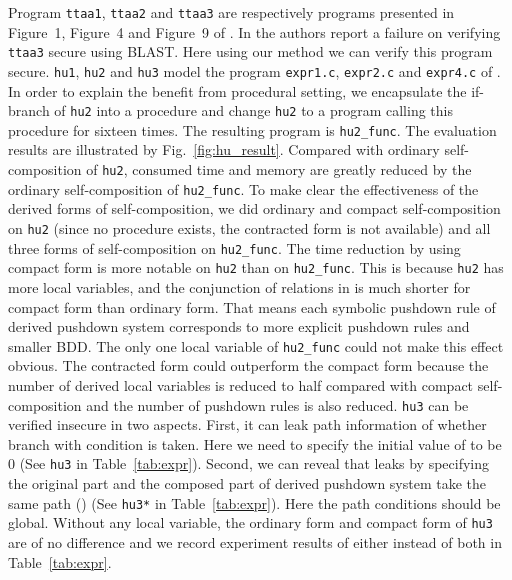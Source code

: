 \documentclass{llncs}
\begin{document}
Program \texttt{ttaa1}, \texttt{ttaa2} and \texttt{ttaa3} are
respectively programs presented in Figure~1, Figure~4 and Figure~9
of \cite{DBLP:conf/sas/TerauchiA05}. In
\cite{DBLP:conf/sas/TerauchiA05} the authors report a failure on
verifying \texttt{ttaa3} secure using BLAST. Here using our method
we can verify this program secure. \texttt{hu1}, \texttt{hu2} and
\texttt{hu3} model the program \texttt{expr1.c}, \texttt{expr2.c}
and \texttt{expr4.c} of \cite{DBLP:conf/pldi/UnnoKY06}. In order to
explain the benefit from procedural setting, we encapsulate the
\textrm{if}-branch of \texttt{hu2} into a procedure and change
\texttt{hu2} to a program calling this procedure for sixteen times.
The resulting program is \texttt{hu2\_func}. The evaluation results
are illustrated by Fig.~\ref{fig:hu_result}. Compared with ordinary
self-composition of \texttt{hu2}, consumed time and memory are
greatly reduced by the ordinary self-composition of
\texttt{hu2\_func}. To make clear the effectiveness of the derived
forms of self-composition, we did ordinary and compact
self-composition on \texttt{hu2} (since no procedure exists, the
contracted form is not available) and all three forms of
self-composition on \texttt{hu2\_func}. The time reduction by using
compact form is more notable on \texttt{hu2} than on
\texttt{hu2\_func}. This is because \texttt{hu2} has more local
variables, and the conjunction of relations in  is much shorter
for compact form than ordinary form. That means each symbolic
pushdown rule of derived pushdown system corresponds to more
explicit pushdown rules and smaller BDD. The only one local variable
of \texttt{hu2\_func} could not make this effect obvious. The
contracted form could outperform the compact form because the number
of derived local variables is reduced to half compared with compact
self-composition and the number of pushdown rules is also reduced.
\texttt{hu3} can be verified insecure in two aspects. First, it can
leak path information of whether branch with condition
 is taken. Here we need to specify the initial
value of  to be 0 (See \texttt{hu3}
in Table~\ref{tab:expr}). Second, we can reveal that
 leaks  by specifying the
original part and the composed part of derived pushdown system take
the same path () (See
\texttt{hu3*} in Table~\ref{tab:expr}). Here the path conditions
 should be global. Without any local variable, the
ordinary form and compact form of \texttt{hu3} are of no difference
and we record experiment results of either instead of both in
Table~\ref{tab:expr}.
\end{document}
